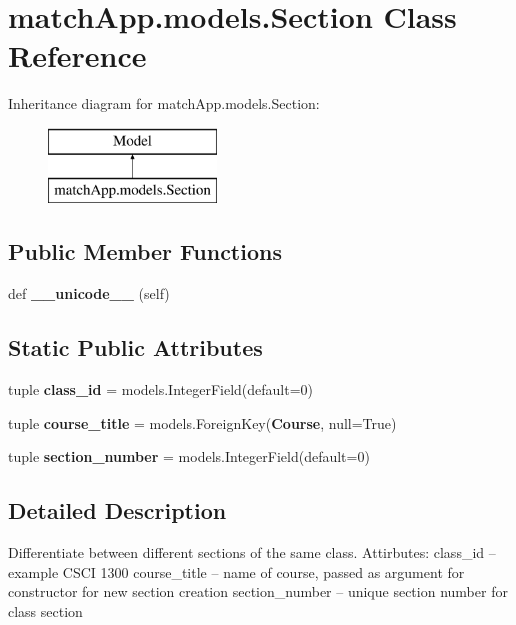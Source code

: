 \section{match\+App.\+models.\+Section Class Reference}
\label{classmatch_app_1_1models_1_1_section}
Inheritance diagram for match\+App.\+models.\+Section\+:\begin{figure}[H]
\begin{center}
\leavevmode
\includegraphics[height=2.000000cm]{classmatch_app_1_1models_1_1_section}
\end{center}
\end{figure}
\subsection*{Public Member Functions}
\begin{DoxyCompactItemize}
\item 
def {\bf \+\_\+\+\_\+unicode\+\_\+\+\_\+} (self)
\end{DoxyCompactItemize}
\subsection*{Static Public Attributes}
\begin{DoxyCompactItemize}
\item 
tuple {\bf class\+\_\+id} = models.\+Integer\+Field(default=0)
\item 
tuple {\bf course\+\_\+title} = models.\+Foreign\+Key({\bf Course}, null=True)
\item 
tuple {\bf section\+\_\+number} = models.\+Integer\+Field(default=0)
\end{DoxyCompactItemize}


\subsection{Detailed Description}
\begin{DoxyVerb}Differentiate between different sections of the same class. 
Attirbutes: 
class_id -- example CSCI 1300
course_title -- name of course, passed as argument for constructor for new section creation
section_number -- unique section number for class section
\end{DoxyVerb}
 

